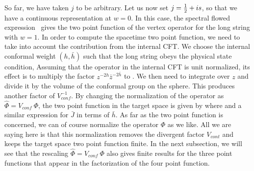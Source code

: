 So far, we have taken $j $ to be arbitrary.
Let us now set  $ j = {1 \over 2}  + is $, so that we
have a  continuous representation at $w=0$. In this case,
the spectral flowed expression \flowedx\ gives
the two point function of the vertex operator
for the long string with $w=1$.
In order to compute the spacetime two point function,
we need to take into account the contribution from the
internal CFT. We choose the internal
conformal weight $(h, \bar h)$ such that the long string
obeys the physical state condition,
\eqn{}
Assuming that the operator in the internal CFT
is unit normalized, its
effect is to  multiply the factor $z^{-2h}\bar z^{-2\bar h}$ to \flowedx.
We then need to integrate over $z$ and divide it by the volume of the
conformal group on the sphere. This produces another factor
of $V_{conf}^{-1}$. By changing the normalization of the operator as
$\hat \Phi = V_{conf} ~ \Phi$, the two point function
in the target space is given by
\eqn{}
where
\eqn{}
and a similar expression for $\bar J$ in terms of $\bar h$.
As far as the two point function is concerned, we can of course
normalize the operator $\Phi$ as we like. All we are saying here
is that this normalization removes the divergent factor $V_{cont}$
and keeps the target space
two point function finite. In the next subsection,
we will see that the rescaling $\hat{\Phi} = V_{conf}~ \Phi$ also
gives finite results for the three point functions that appear
in the factorization of the four point function.

